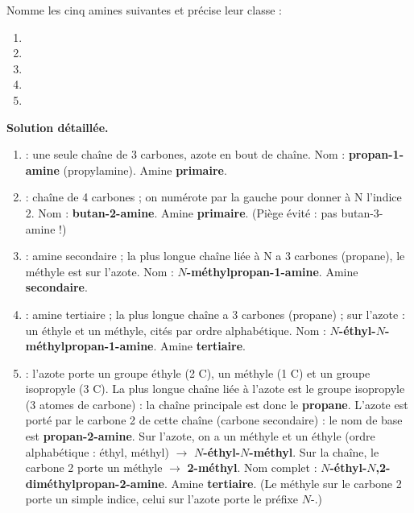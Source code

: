 \documentclass[11pt]{article}
\begin{document}
\begin{exoresolu}
Nomme les cinq amines suivantes et précise leur classe :
\begin{enumerate}
\item {}
\item {}
\item {}
\item {}
\item {}
\end{enumerate}
\tcblower
\textbf{Solution détaillée.}
\begin{enumerate}
\item {} : une seule chaîne de 3 carbones, azote en bout de chaîne. Nom : \textbf{propan-1-amine} (propylamine). Amine \textbf{primaire}.
\item {} : chaîne de 4 carbones ; on numérote par la gauche pour donner à N l'indice 2. Nom : \textbf{butan-2-amine}. Amine \textbf{primaire}. (Piège évité : pas butan-3-amine !)
\item {} : amine secondaire ; la plus longue chaîne liée à N a 3 carbones (propane), le méthyle est sur l'azote. Nom : \textbf{$N$-méthylpropan-1-amine}. Amine \textbf{secondaire}.
\item {} : amine tertiaire ; la plus longue chaîne a 3 carbones (propane) ; sur l'azote : un éthyle et un méthyle, cités par ordre alphabétique. Nom : \textbf{$N$-éthyl-$N$-méthylpropan-1-amine}. Amine \textbf{tertiaire}.
\item {} : l'azote porte un groupe éthyle (2 C), un méthyle (1 C) et un groupe isopropyle  (3 C). La plus longue chaîne liée à l'azote est le groupe isopropyle (3 atomes de carbone) : la chaîne principale est donc le \textbf{propane}. L'azote est porté par le carbone 2 de cette chaîne (carbone secondaire) : le nom de base est \textbf{propan-2-amine}. Sur l'azote, on a un méthyle et un éthyle (ordre alphabétique : éthyl, méthyl) $\rightarrow$ \textbf{$N$-éthyl-$N$-méthyl}. Sur la chaîne, le carbone 2 porte un méthyle $\rightarrow$ \textbf{2-méthyl}. Nom complet : \textbf{$N$-éthyl-$N$,2-diméthylpropan-2-amine}. Amine \textbf{tertiaire}. (Le méthyle sur le carbone 2 porte un simple indice, celui sur l'azote porte le préfixe $N$-.)
\end{enumerate}
\end{exoresolu}
\end{document}
